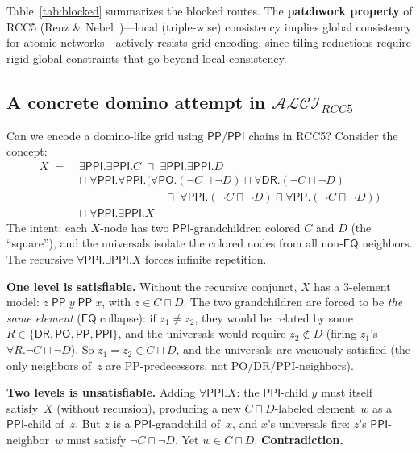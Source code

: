 \documentclass[
]{ceurart}
\theoremstyle{definition}
\newcommand{\ALCIRCC}[1]{\ensuremath{\mathcal{ALCI}_{\mathit{RCC#1}}}}
\newcommand{\DR}{\ensuremath{\mathsf{DR}}}
\newcommand{\PO}{\ensuremath{\mathsf{PO}}}
\newcommand{\EQ}{\ensuremath{\mathsf{EQ}}}
\newcommand{\PP}{\ensuremath{\mathsf{PP}}}
\newcommand{\PPI}{\ensuremath{\mathsf{PPI}}}
\newcommand{\RCCfive}{\{\DR,\PO,\PP,\PPI\}}
\begin{document}
Table~\ref{tab:blocked} summarizes the blocked routes.
The \textbf{patchwork property} of RCC5 (Renz \& Nebel~\cite{RenzNebel1999})---local
(triple-wise) consistency implies global consistency for atomic
networks---actively resists grid encoding, since tiling reductions
require rigid global constraints that go beyond local consistency.

\subsection{A concrete domino attempt in $\ALCIRCC{5}$}
\label{sec:domino-attempt}

Can we encode a domino-like grid using $\PP/\PPI$ chains in RCC5?
Consider the concept:
\begin{align*}
  X \;=\; &\exists\PPI.\exists\PPI.C \;\sqcap\; \exists\PPI.\exists\PPI.D \\
  &\sqcap\; \forall\PPI.\forall\PPI.(\forall\PO.(\neg C \sqcap \neg D)
    \sqcap \forall\DR.(\neg C \sqcap \neg D) \\
  &\qquad\qquad\qquad\quad\;\;
    \sqcap\; \forall\PPI.(\neg C \sqcap \neg D)
    \sqcap \forall\PP.(\neg C \sqcap \neg D)) \\
  &\sqcap\; \forall\PPI.\exists\PPI.X
\end{align*}
The intent: each $X$-node has two $\PPI$-grandchildren colored $C$
and $D$ (the ``square''), and the universals isolate the colored
nodes from all non-$\EQ$ neighbors.  The recursive
$\forall\PPI.\exists\PPI.X$ forces infinite repetition.

\medskip\noindent\textbf{One level is satisfiable.}
Without the recursive conjunct, $X$ has a 3-element model:
$z \;\PP\; y \;\PP\; x$, with $z \in C \sqcap D$.
The two grandchildren are forced to be \emph{the same element}
($\EQ$ collapse): if $z_1 \neq z_2$, they would be related by
some $R \in \RCCfive$, and the universals would require $z_2 \notin D$
(firing $z_1$'s $\forall R.\neg C \sqcap \neg D$).
So $z_1 = z_2 \in C \sqcap D$, and the universals are vacuously
satisfied (the only neighbors of~$z$ are PP-predecessors, not
PO/DR/PPI-neighbors).

\medskip\noindent\textbf{Two levels is unsatisfiable.}
Adding $\forall\PPI.X$: the $\PPI$-child $y$ must itself satisfy~$X$
(without recursion), producing a new $C \sqcap D$-labeled element~$w$
as a $\PPI$-child of~$z$.  But $z$ is a $\PPI$-grandchild of~$x$,
and $x$'s universals fire: $z$'s $\PPI$-neighbor~$w$ must satisfy
$\neg C \sqcap \neg D$.  Yet $w \in C \sqcap D$.
\textbf{Contradiction.}
\end{document}
